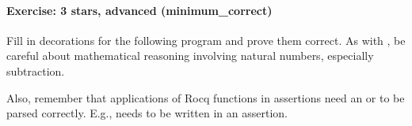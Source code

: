 \documentclass[12pt]{report}
\begin{document}
\paragraph{Exercise: 3 stars, advanced (minimum\_correct)}




    Fill in decorations for the following program and prove them
    correct.  As with , be careful about mathematical
    reasoning involving natural numbers, especially subtraction.


    Also, remember that applications of Rocq functions in assertions
    need an  or  to be parsed correctly.  E.g.,   
    needs to be written     in an assertion.
\end{document}
